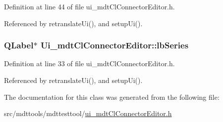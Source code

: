 Definition at line 44 of file ui\-\_\-mdt\-Cl\-Connector\-Editor.\-h.



Referenced by retranslate\-Ui(), and setup\-Ui().

\hypertarget{class_ui__mdt_cl_connector_editor_a39ccec5a8b4098df19f6b7f05cdde6fd}{
\subsubsection[{lb\-Series}]{\setlength{\rightskip}{0pt plus 5cm}Q\-Label$\ast$ Ui\-\_\-mdt\-Cl\-Connector\-Editor\-::lb\-Series}}\label{class_ui__mdt_cl_connector_editor_a39ccec5a8b4098df19f6b7f05cdde6fd}


Definition at line 33 of file ui\-\_\-mdt\-Cl\-Connector\-Editor.\-h.



Referenced by retranslate\-Ui(), and setup\-Ui().



The documentation for this class was generated from the following file\-:\begin{DoxyCompactItemize}
\item 
src/mdttools/mdttesttool/\hyperlink{ui__mdt_cl_connector_editor_8h}{ui\-\_\-mdt\-Cl\-Connector\-Editor.\-h}\end{DoxyCompactItemize}
